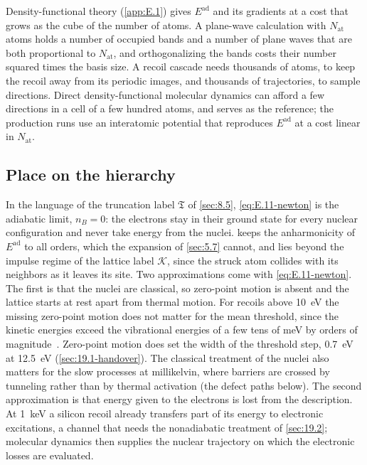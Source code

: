 Density-functional theory (\cref{app:E.1}) gives $E^{\mathrm{ad}}$ and its gradients at a cost that grows as the cube of the number of atoms. A plane-wave calculation with $N_{\mathrm{at}}$ atoms holds a number of occupied bands and a number of plane waves that are both proportional to $N_{\mathrm{at}}$, and orthogonalizing the bands costs their number squared times the basis size. A recoil cascade needs thousands of atoms, to keep the recoil away from its periodic images, and thousands of trajectories, to sample directions. Direct density-functional molecular dynamics can afford a few directions in a cell of a few hundred atoms, and serves as the reference; the production runs use an interatomic potential that reproduces $E^{\mathrm{ad}}$ at a cost linear in $N_{\mathrm{at}}$.

\subsection{Place on the hierarchy}

In the language of the truncation label $\mathfrak{T}$ of \cref{sec:8.5}, \cref{eq:E.11-newton} is the adiabatic limit, $n_B = 0$: the electrons stay in their ground state for every nuclear configuration and never take energy from the nuclei.  keeps the anharmonicity of $E^{\mathrm{ad}}$ to all orders, which the expansion of \cref{sec:5.7} cannot, and lies beyond the impulse regime of the lattice label $\mathcal{K}$, since the struck atom collides with its neighbors as it leaves its site. Two approximations come with \cref{eq:E.11-newton}. The first is that the nuclei are classical, so zero-point motion is absent and the lattice starts at rest apart from thermal motion. For recoils above \SI{10}{eV} the missing zero-point motion does not matter for the mean threshold, since the kinetic energies exceed the vibrational energies of a few tens of meV by orders of magnitude~\cite[Sect.~II\,A]{sassi2022energy}. Zero-point motion does set the width of the threshold step, \SI{0.7}{eV} at \SI{12.5}{eV} (\cref{sec:19.1-handover}). The classical treatment of the nuclei also matters for the slow processes at millikelvin, where barriers are crossed by tunneling rather than by thermal activation (the defect paths below). The second approximation is that energy given to the electrons is lost from the description. At \SI{1}{keV} a silicon recoil already transfers part of its energy to electronic excitations, a channel that needs the nonadiabatic treatment of \cref{sec:19.2}; molecular dynamics then supplies the nuclear trajectory on which the electronic losses are evaluated.

